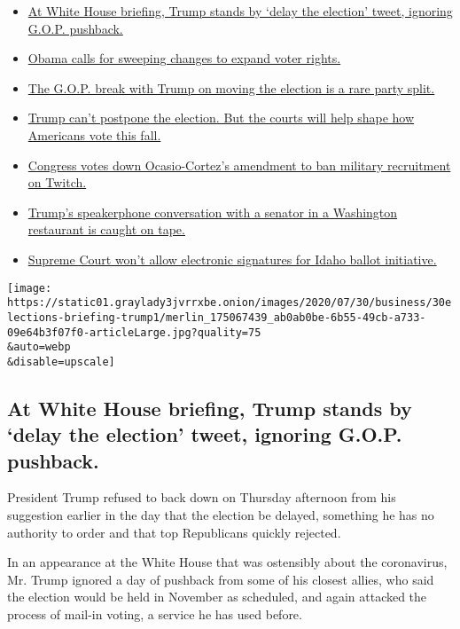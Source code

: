 \begin{itemize}
\tightlist
\item
  \protect\hyperlink{link-301a32eb}{At White House briefing, Trump
  stands by `delay the election' tweet, ignoring G.O.P. pushback.}
\item
  \protect\hyperlink{link-7c96adc}{Obama calls for sweeping changes to
  expand voter rights.}
\item
  \protect\hyperlink{link-2636310}{The G.O.P. break with Trump on moving
  the election is a rare party split.}
\item
  \protect\hyperlink{link-7d171f8e}{Trump can't postpone the election.
  But the courts will help shape how Americans vote this fall.}
\item
  \protect\hyperlink{link-4a528e86}{Congress votes down Ocasio-Cortez's
  amendment to ban military recruitment on Twitch.}
\item
  \protect\hyperlink{link-5d840c86}{Trump's speakerphone conversation
  with a senator in a Washington restaurant is caught on tape.}
\item
  \protect\hyperlink{link-79cd5851}{Supreme Court won't allow electronic
  signatures for Idaho ballot initiative.}
\end{itemize}

\texttt{[image: https://static01.graylady3jvrrxbe.onion/images/2020/07/30/business/30elections-briefing-trump1/merlin\_175067439\_ab0ab0be-6b55-49cb-a733-09e64b3f07f0-articleLarge.jpg?quality=75\\\&auto=webp\\\&disable=upscale]}

\hypertarget{at-white-house-briefing-trump-stands-by-delay-the-election-tweet-ignoring-gop-pushback}{%
\subsection{At White House briefing, Trump stands by `delay the
election' tweet, ignoring G.O.P.
pushback.}\label{at-white-house-briefing-trump-stands-by-delay-the-election-tweet-ignoring-gop-pushback}}

President Trump refused to back down on Thursday afternoon from his
suggestion earlier in the day that the election be delayed, something he
has no authority to order and that top Republicans quickly rejected.

In an appearance at the White House that was ostensibly about the
coronavirus, Mr. Trump ignored a day of pushback from some of his
closest allies, who said the election would be held in November as
scheduled, and again attacked the process of mail-in voting, a service
he has used before.

